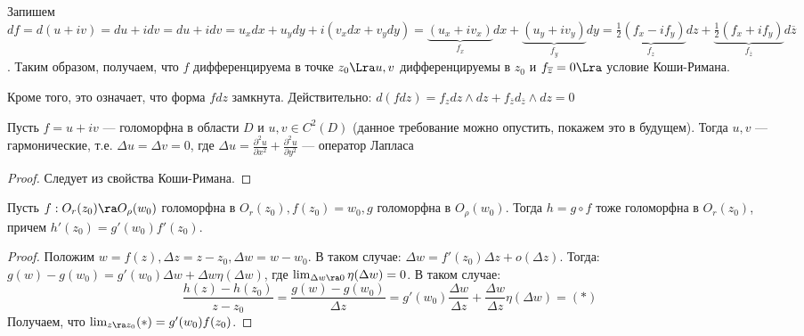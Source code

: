 
\begin{note}
    Запишем \(df = d(u + iv) = du + idv = du + idv = u_xdx + u_ydy + i(v_xdx + v_ydy) = \underbrace{(u_x + iv_x)}_{f_x}dx + \underbrace{(u_y + iv_y)}_{f_y}dy = \underbrace{\frac{1}{2}\left( f_x - if_y \right)}_{f_z}dz + \underbrace{\frac{1}{2}\left( f_x + if_y \right)}_{f_{\overline{z}}}d\overline{z}\). Таким образом, получаем, что \(f\) дифференцируема в точке \(z_0 \Lra u, v\) дифференцируемы в \(z_0\) и \(f_{\overline{z}} = 0 \Lra\) условие Коши-Римана.

    Кроме того, это означает, что форма \(fdz\) замкнута. Действительно: \(d(fdz) = f_zdz \wedge dz + f_{\overline{z}}d_{\overline{z}} \wedge dz = 0\)
\end{note}

\begin{note}
    Пусть \(f = u + iv\) --- голоморфна в области \(D\) и \(u, v \in C^2(D)\) (данное требование можно опустить, покажем это в будущем). Тогда \(u, v\) --- гармонические, т.е. \(\Delta u = \Delta v = 0\), где \(\Delta u = \frac{\partial^2 u}{\partial x^2} + \frac{\partial^2 u}{\partial y^2}\) --- оператор Лапласа
\end{note}
\begin{proof}
    Следует из свойства Коши-Римана.
\end{proof}

\begin{proposition}
    Пусть \(f: O_r(z_0) \ra O_\rho(w_0)\) голоморфна в \(O_r(z_0), f(z_0) = w_0, g\) голоморфна в \(O_\rho(w_0)\). Тогда \(h = g \circ f\) тоже голоморфна в \(O_r(z_0)\), причем \(h'(z_0) = g'(w_0)f'(z_0)\).
\end{proposition}
\begin{proof}
    Положим \(w = f(z), \Delta z = z - z_0, \Delta w = w - w_0\). В таком случае: \(\Delta w = f'(z_0)\Delta z + o(\Delta z)\). Тогда: \(g(w) - g(w_0) = g'(w_0)\Delta w + \Delta w \eta(\Delta w)\), где \(\lim_{\Delta w \ra 0}\eta(\Delta w) = 0\). В таком случае:
    \[\frac{h(z) - h(z_0)}{z - z_0} = \frac{g(w) - g(w_0)}{\Delta z} = g'(w_0) \frac{\Delta w}{\Delta z} + \frac{\Delta w}{\Delta z}\eta(\Delta w) = (*)\]
    Получаем, что \(\lim_{z \ra z_0} (*) = g'(w_0)f(z_0)\).
\end{proof}

